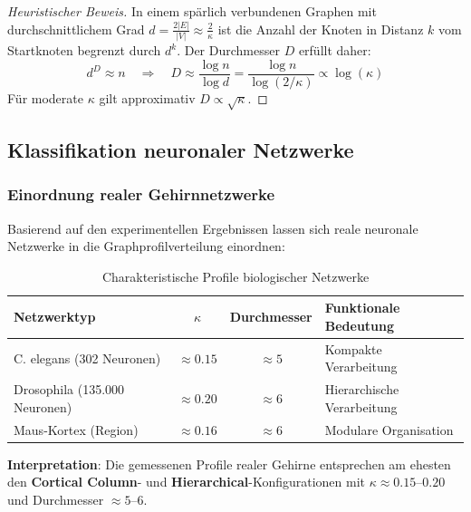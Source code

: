 ﻿\documentclass[a4paper,12pt]{article}
\theoremstyle{definition}
\begin{document}
	\begin{proof}[Heuristischer Beweis]
		In einem spärlich verbundenen Graphen mit durchschnittlichem Grad $d = \frac{2|E|}{|V|} \approx \frac{2}{\kappa}$ ist die Anzahl der Knoten in Distanz $k$ vom Startknoten begrenzt durch $d^k$. Der Durchmesser $D$ erfüllt daher:
		\[
		d^D \approx n \quad \Rightarrow \quad D \approx \frac{\log n}{\log d} = \frac{\log n}{\log(2/\kappa)} \propto \log(\kappa)
		\]
		Für moderate $\kappa$ gilt approximativ $D \propto \sqrt{\kappa}$.
	\end{proof}
	
	\subsection{Klassifikation neuronaler Netzwerke}
	
	\subsubsection{Einordnung realer Gehirnnetzwerke}
	
	Basierend auf den experimentellen Ergebnissen lassen sich reale neuronale Netzwerke in die Graphprofilverteilung einordnen:
	
	\begin{table}[H]
		\centering
		\caption{Charakteristische Profile biologischer Netzwerke}
		\label{tab:bio_profiles}
		\begin{tabular}{lccl}
			\hline
			\textbf{Netzwerktyp} & $\kappa$ & \textbf{Durchmesser} & \textbf{Funktionale Bedeutung} \\
			\hline
			C. elegans (302 Neuronen) & $\approx 0.15$ & $\approx 5$ & Kompakte Verarbeitung \\
			Drosophila (135.000 Neuronen) & $\approx 0.20$ & $\approx 6$ & Hierarchische Verarbeitung \\
			Maus-Kortex (Region) & $\approx 0.16$ & $\approx 6$ & Modulare Organisation \\
			\hline
		\end{tabular}
	\end{table}
	
	\textbf{Interpretation}: Die gemessenen Profile realer Gehirne entsprechen am ehesten den \textbf{Cortical Column}- und \textbf{Hierarchical}-Konfigurationen mit $\kappa \approx 0.15\text{--}0.20$ und Durchmesser $\approx 5\text{--}6$.
\end{document}
